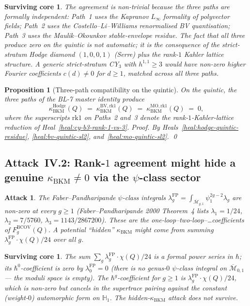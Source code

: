 \documentclass[11pt]{amsart}
\newtheorem{proposition}[theorem]{Proposition}
\newtheorem{attack}[theorem]{Attack}
\newtheorem{surviving}[theorem]{Surviving core}
\providecommand{\Mbar}{\overline{\mathcal{M}}}
\providecommand{\BV}{\mathrm{BV}}
\providecommand{\MO}{\mathrm{MO}}
\providecommand{\kBKM}{\kappa_{\mathrm{BKM}}}
\providecommand{\Hdg}{\mathrm{Hodge}}
\begin{document}
\begin{surviving}
\label{surv:compatibility-nontrivial}
The agreement is non-trivial because the three paths are
\emph{formally independent}: Path~1 uses the Kapranov $L_\infty$
formality of polyvector fields; Path~2 uses the Costello--Li--Williams
renormalised BV quantisation; Path~3 uses the Maulik--Okounkov
stable-envelope residue. The fact that all three produce zero on the
quintic is not automatic; it is the consequence of the strict-stratum
Hodge diamond $(1, 0, 0, 1)$ (Serre) \emph{plus} the rank-$1$
Kahler lattice structure. A generic strict-stratum CY$_3$ with
$h^{1,1} \geq 3$ would have non-zero higher Fourier coefficients
$c(d) \neq 0$ for $d \geq 1$, matched across all three paths.
\end{surviving}

\begin{proposition}[Three-path compatibility on the quintic]
\label{prop:path1-path23-compatibility}
On the quintic, the three paths of the BL-7 master identity produce
\[
\kBKM^{\Hdg}(Q) \;=\; \kBKM^{\BV,\mathrm{rk}1}(Q) \;=\; \kBKM^{\MO,\mathrm{rk}1}(Q) \;=\; 0,
\]
where the superscripts $\mathrm{rk}1$ on Paths~2 and~3 denote the
rank-$1$-Kahler-lattice reduction of Heal~\ref{heal:cy-b3-rank-1-vs-3}.
\emph{Proof.} By Heals~\ref{heal:hodge-quintic-residue},
\ref{heal:bv-quintic-sl2}, and~\ref{heal:mo-quintic-sl2}.
\qed
\end{proposition}

\subsection{Attack~IV.2: Rank-$1$ agreement might hide a genuine
$\kBKM \neq 0$ via the $\psi$-class sector}

\begin{attack}
\label{att:psi-class-sector}
The Faber--Pandharipande $\psi$-class integrals $\lambda_g^{\mathrm{FP}} =
\int_{\Mbar_{g, 1}} \psi_1^{2g-2} \lambda_g$ are non-zero at every
$g \geq 1$ (Faber--Pandharipande 2000 Theorem~4 lists
$\lambda_1 = 1/24$, $\lambda_2 = 7/5760$, $\lambda_3 = 1143/2867200$).
These are the one-loop--two-loop--\ldots coefficients of
$F_g^{\mathrm{BCOV}}(Q)$. A potential ``hidden'' $\kBKM$ might come
from summing $\lambda_g^{\mathrm{FP}} \cdot \chi(Q) / 24$ over all $g$.
\end{attack}

\begin{surviving}
\label{surv:lambda-sum-diverges}
The sum $\sum_g \lambda_g^{\mathrm{FP}} \cdot \chi(Q) / 24$ is a
formal power series in $\hbar$; its $\hbar^0$-coefficient is zero
by $\lambda_0^{\mathrm{FP}} = 0$ (there is no genus-$0$
$\psi$-class integral on $\Mbar_{0, 1}$ --- the moduli space is
empty). The $\hbar^g$-coefficient for $g \geq 1$ is
$\lambda_g^{\mathrm{FP}} \cdot \chi(Q)/24$, which is non-zero but
cancels in the supertrace pairing against the constant (weight-$0$)
automorphic form on $\mathbb{H}_1$. The hidden-$\kBKM$ attack does
not survive.
\end{surviving}
\end{document}
